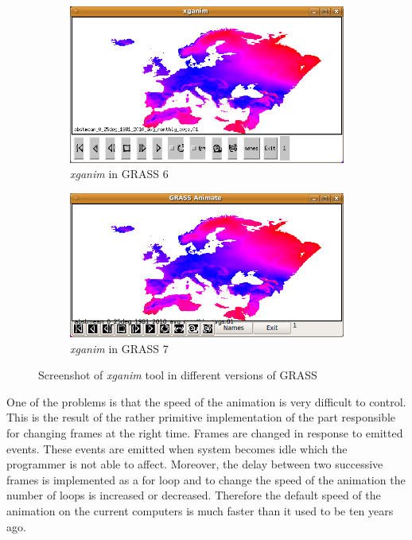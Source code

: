 \documentclass[a4paper,12pt,oneside]{book}
\newcommand{\module}[1]{\textsl{#1}}
\begin{document}
\begin{figure}[ht!]
\centering
    \begin{subfigure}[ht]{0.49\textwidth}
    \centering
        \includegraphics[width=\textwidth]{./images/xganim64.png}
    \caption{\module{xganim} in GRASS 6}
    \label{fig:xganim6}
    \end{subfigure}
    \begin{subfigure}[ht]{0.49\textwidth}
    \centering
        \includegraphics[width=\textwidth]{./images/xganim7.png}
    \caption{\module{xganim} in GRASS 7}
    \label{fig:xganim7}
    \end{subfigure}
\caption{Screenshot of \module{xganim} tool in different versions of GRASS}
\label{fig:xganim}
\end{figure}

One of the problems is that the speed of the animation is very difficult to control.
This is the result of the rather primitive implementation of the part
responsible for changing frames at the right time.
Frames are changed in response to emitted events.
These events are emitted when system becomes idle which the programmer is not able to affect.
Moreover, the delay between two successive frames is implemented as a for loop
and to change the speed of the animation the number of loops is increased or decreased.
Therefore the default speed of the animation on the current computers
is much faster than it used to be ten years ago.
\end{document}
